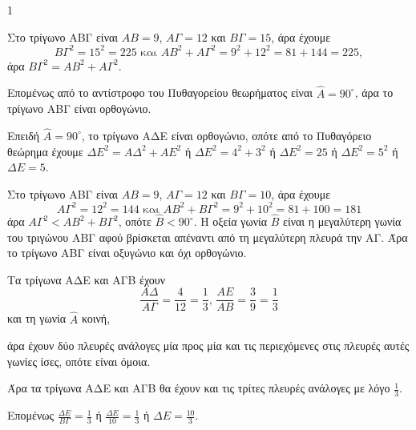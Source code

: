 \begin{ylh}{1}
	\item[α)] 
	\begin{rlist}
		\item Στο τρίγωνο ΑΒΓ είναι $ΑΒ = 9$, $ΑΓ = 12$ και $ΒΓ = 15$, άρα έχουμε
		\[ ΒΓ^2 = 15^2 = 225 \text{ και } ΑΒ^2 + ΑΓ^2 = 9^2 + 12^2 = 81 + 144 = 225, \]
		άρα $ΒΓ^2 = ΑΒ^2 + ΑΓ^2$.
		
		Επομένως από το αντίστροφο του Πυθαγορείου θεωρήματος είναι $\hat{Α} = 90^\circ$, άρα το τρίγωνο ΑΒΓ είναι ορθογώνιο.
		
		\item Επειδή $\hat{Α} = 90^\circ$, το τρίγωνο ΑΔΕ είναι ορθογώνιο, οπότε από το Πυθαγόρειο θεώρημα έχουμε $ΔΕ^2 = ΑΔ^2 + ΑΕ^2$ ή $ΔΕ^2 = 4^2 + 3^2$ ή $ΔΕ^2 = 25$ ή $ΔΕ^2 = 5^2$ ή $ΔΕ = 5$.
	\end{rlist}
	
	\item[β)] 
	\begin{rlist}
		\item Στο τρίγωνο ΑΒΓ είναι $ΑΒ = 9$, $ΑΓ = 12$ και $ΒΓ = 10$, άρα έχουμε
		\[ ΑΓ^2 = 12^2 = 144 \text{ και } ΑΒ^2 + ΒΓ^2 = 9^2 + 10^2 = 81 + 100 = 181 \]
		άρα $ΑΓ^2 < ΑΒ^2 + ΒΓ^2$, οπότε $\hat{Β} < 90^\circ$. Η οξεία γωνία $\hat{Β}$ είναι η μεγαλύτερη γωνία του τριγώνου ΑΒΓ αφού βρίσκεται απέναντι από τη μεγαλύτερη πλευρά την ΑΓ. Άρα το τρίγωνο ΑΒΓ είναι οξυγώνιο και όχι ορθογώνιο.
		
		\item Τα τρίγωνα ΑΔΕ και ΑΓΒ έχουν
		\[ \frac{ΑΔ}{ΑΓ} = \frac{4}{12} = \frac{1}{3} \text{, } \frac{ΑΕ}{ΑΒ} = \frac{3}{9} = \frac{1}{3} \]
		και τη γωνία $\hat{Α}$ κοινή,
		
		άρα έχουν δύο πλευρές ανάλογες μία προς μία και τις περιεχόμενες στις πλευρές αυτές γωνίες ίσες, οπότε είναι όμοια.
		
		Άρα τα τρίγωνα ΑΔΕ και ΑΓΒ θα έχουν και τις τρίτες πλευρές ανάλογες με λόγο $\displaystyle\frac{1}{3}$.
		
		Επομένως $\displaystyle\frac{ΔΕ}{ΒΓ} = \frac{1}{3}$ ή $\displaystyle\frac{ΔΕ}{10} = \frac{1}{3}$ ή $ΔΕ = \displaystyle\frac{10}{3}$.
	\end{rlist}
\end{ylh}